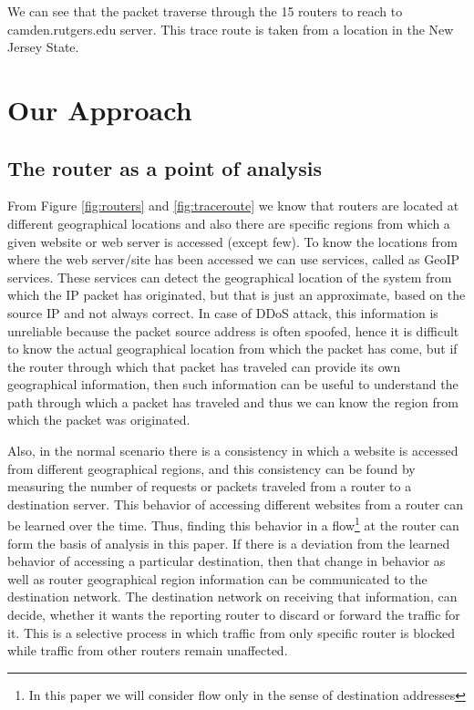 \documentclass[12pt,oneside,a4paper]{article}
\begin{document}
We can see that the packet traverse through the 15 routers to reach to camden.rutgers.edu server. This trace route is taken from a location in the New Jersey State.\par
\pagebreak
\section{Our Approach}

\subsection{The router as a point of analysis}
From Figure \ref{fig:routers} and \ref{fig:traceroute} we know that routers are located at different geographical locations and also there are specific regions from which a given website or web server is accessed (except few). To know the locations from where the web server/site has been accessed we can use services, called as GeoIP services. These services can detect the geographical location of the system from which the IP packet has originated, but that is just an approximate, based on the source IP and not always correct. In case of DDoS attack, this information is unreliable because the packet source address is often spoofed, hence it is difficult to know the actual geographical location from which the packet has come, but if the router through which that packet has traveled can provide its own geographical information, then such information can be useful to understand the path through which a packet has traveled and thus we can know the region from which the packet was originated.\par

Also, in the normal scenario there is a consistency in which a website is accessed from different geographical regions, and this consistency can be found by measuring the number of requests or packets traveled from a router to a destination server. This behavior of accessing different websites from a router can be learned over the time. Thus, finding this behavior in a flow\footnote{In this paper we will consider flow only in the sense of destination addresses} at the router can form the basis of analysis in this paper. If there is a deviation from the learned behavior of accessing a particular destination, then that change in behavior as well as router geographical region information can be communicated to the destination network. The destination network on receiving that information, can decide, whether it wants the reporting router to discard or forward the traffic for it. This is a selective process in which traffic from only specific router is blocked while traffic from other routers remain unaffected.
\end{document}
